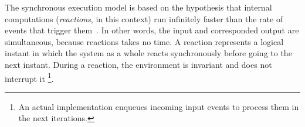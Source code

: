 \documentclass{acm_proc_article-sp}
\newcommand{\1}{\;}
\newcommand{\2}{\;\;}
\newcommand{\3}{\;\;\;}
\newcommand{\5}{\;\;\;\;\;}
\begin{document}

The synchronous execution model is based on the hypothesis that internal 
computations (\emph{reactions}, in this context) run infinitely faster than the 
rate of events that trigger them~\cite{rp.hypothesis}.
In other words, the input and corresponded output are simultaneous, because 
reactions takes no time.
A reaction represents a logical instant in which the system as a whole reacts 
synchronously before going to the next instant.
%
During a reaction, the environment is invariant and does not interrupt it%
\footnote{
An actual implementation enqueues incoming input events to process them in the 
next iterations.
}.
\end{document}
